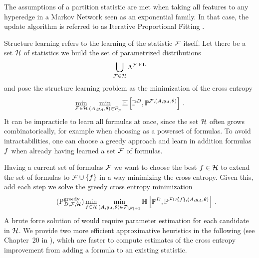 The assumptions of a partition statistic are met when taking all features to any hyperedge in a Markov Network seen as an exponential family.
In that case, the update algorithm is referred to as Iterative Proportional Fitting \cite{wainwright_graphical_2008}.



Structure learning refers to the learning of the statistic $\mathcal{F}$ itself.
Let there be a set $\mathcal{H}$ of statistics we build the set of parametrized distributions
\begin{align*}
    \bigcup_{\mathcal{F}\in\mathcal{H}} \Lambda^{\mathcal{F},\mathrm{EL}}
\end{align*}
and pose the structure learning problem as the minimization of the cross entropy
\begin{align*}
    \min_{\mathcal{F}\in\mathcal{H}} \min_{(A,y_{A},\theta)\in\mathcal{P}_{p}} \mathbb{H}\left[\mathbb{P}^{D},\mathbb{P}^{\mathcal{F},(A,y_{A},\theta)}\right] \, .
\end{align*}
It can be impracticle to learn all formulas at once, since the set $\mathcal{H}$ often grows combinatorically, for example when choosing as a powerset of formulas.
To avoid intractabilities, one can choose a greedy approach and learn in addition formulas $f$ when already having learned a set $\mathcal{F}$ of formulas.


Having a current set of formulas $\mathcal{F}$ we want to choose the best $f\in\mathcal{H}$ to extend the set of formulas to $\mathcal{F}\cup\{f\}$ in a way minimizing the cross entropy.
Given this, add each step we solve the greedy cross entropy minimization
\begin{align}
    \label{prob:perfectGreedy}\tag{$\probtagtypeinst{\greedysymbol}{\datamap,\hlnstat,\greedyhypothesis}$}
    \min_{\formula\in\greedyhypothesis} \min_{\hybridparam\in\hybridparamsetofdim{\cardof{\hlnstat}+1}}
    \centropyof{\empdistribution}{\probof{\hlnstat\cup\{\formula\},\hybridparam}} \, .
\end{align}
A brute force solution of  would require parameter estimation for each candidate in $\mathcal{H}$.
We provide two more efficient approximative heuristics in the following (see Chapter~20 in \cite{koller_probabilistic_2009}), which are faster to compute estimates of the cross entropy improvement from adding a formula to an existing statistic.


